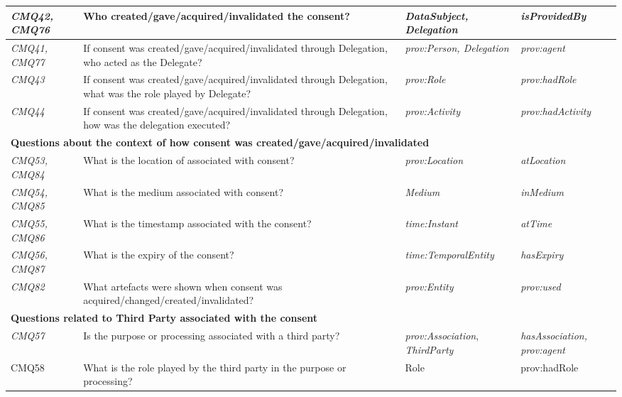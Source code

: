 \begin{table}[htbp]
\begin{tabularx}{\textwidth}{|p{1cm}|X|p{4cm}|p{3.5cm}|}
\textit{CMQ42, CMQ76} & Who created/gave/acquired/invalidated the consent? & \textit{DataSubject, Delegation} & \textit{isProvidedBy} \\ \hline
\textit{CMQ41, CMQ77} & If consent was created/gave/acquired/invalidated through Delegation, who acted as the Delegate? & \textit{prov:Person, Delegation} & \textit{prov:agent} \\ \hline
\textit{CMQ43} & If consent was created/gave/acquired/invalidated through Delegation, what was the role played by Delegate? & \textit{prov:Role} & \textit{prov:hadRole} \\ \hline
\textit{CMQ44} & If consent was created/gave/acquired/invalidated through Delegation, how was the delegation executed? & \textit{prov:Activity} & \textit{prov:hadActivity} \\ \hline
\multicolumn{4}{|l|}{\textbf{Questions about the context of how consent was created/gave/acquired/invalidated}} \\ \hline
\textit{CMQ53, CMQ84} & What is the location of associated with consent? & \textit{prov:Location} & \textit{atLocation} \\ \hline
\textit{CMQ54, CMQ85} & What is the medium associated with consent? & \textit{Medium} & \textit{inMedium} \\ \hline
\textit{CMQ55, CMQ86} & What is the timestamp associated with the consent? & \textit{time:Instant} & \textit{atTime} \\ \hline
\textit{CMQ56, CMQ87} & What is the expiry of the consent? & \textit{time:TemporalEntity} & \textit{hasExpiry} \\ \hline
\textit{CMQ82} & What artefacts were shown when consent was acquired/changed/created/invalidated? & \textit{prov:Entity} & \textit{prov:used} \\ \hline
\multicolumn{4}{|l|}{\textbf{Questions related to Third Party associated with the consent}} \\ \hline
\textit{CMQ57} & Is the purpose or processing associated with a third party? & \textit{prov:Association}, \textit{ThirdParty} & \textit{hasAssociation, prov:agent} \\ \hline
CMQ58 & What is the role played by the third party in the purpose or processing? & Role & prov:hadRole \\ \hline
\end{tabularx}
\label{table:gconsent:cq}
\end{table}

